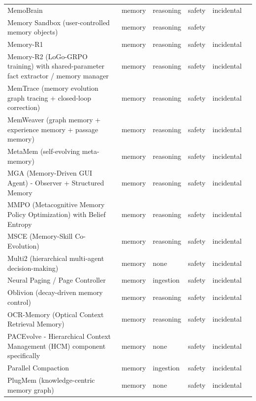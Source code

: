 \begin{longtable}{@{}>{\raggedright\arraybackslash}p{}lllll@{}}
MemoBrain & memory & reasoning & safety & incidental & \cite{qian-2026-memobrain} \\
Memory Sandbox (user-controlled memory objects) & memory & reasoning & safety &  & \cite{huang-2023-memory} \\
Memory-R1 & memory & reasoning & safety & incidental & \cite{yan-2025-memoryr1} \\
Memory-R2 (LoGo-GRPO training) with shared-parameter fact extractor / memory manager & memory & reasoning & safety & incidental & \cite{yan-2026-memoryr2} \\
MemTrace (memory evolution graph tracing + closed-loop correction) & memory & reasoning & safety & incidental & \cite{deng-2026-memtrace} \\
MemWeaver (graph memory + experience memory + passage memory) & memory & reasoning & safety & incidental & \cite{ye-2026-memweaver} \\
MetaMem (self-evolving meta-memory) & memory & reasoning & safety & incidental & \cite{xin-2026-metamem} \\
MGA (Memory-Driven GUI Agent) - Observer + Structured Memory & memory & reasoning & safety & incidental & \cite{cheng-2025-mga} \\
MMPO (Metacognitive Memory Policy Optimization) with Belief Entropy & memory & reasoning & safety & incidental & \cite{liu-2026-metacognitive} \\
MSCE (Memory-Skill Co-Evolution) & memory & reasoning & safety & incidental & \cite{tang-2026-memory} \\
Multi2 (hierarchical multi-agent decision-making) & memory & none & safety & incidental & \cite{park-2026-multi} \\
Neural Paging / Page Controller & memory & ingestion & safety & incidental & \cite{chen-2026-neural} \\
Oblivion (decay-driven memory control) & memory & reasoning & safety & incidental & \cite{rana-2026-oblivion} \\
OCR-Memory (Optical Context Retrieval Memory) & memory & reasoning & safety & incidental & \cite{li-2026-ocrmemory} \\
PACEvolve - Hierarchical Context Management (HCM) component specifically & memory & none & safety & incidental & \cite{yan-2026-pacevolve} \\
Parallel Compaction & memory & ingestion & safety & incidental & \cite{cim-2026-parallel} \\
PlugMem (knowledge-centric memory graph) & memory & none & safety & incidental & \cite{yang-2026-plugmem} \\

\end{longtable}
